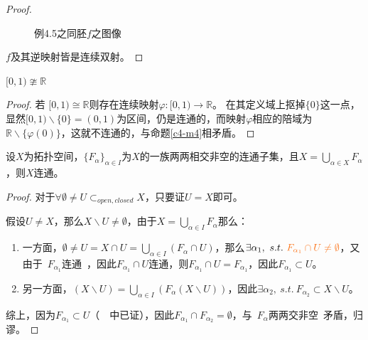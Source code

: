 \documentclass[lang=cn,10pt,device=pad]{elegantbook}
\newcommand{\cusong}{\CJKfamily{cusong}}%
\newcommand{\tl}[1]{\textcolor{myor}{#1}}
\newcommand{\lei}[1]{~\textcolor{myblu}{\cusong{#1}}~}
\newcommand{\lanse}[1]{~\textcolor{myblu}{#1}~}
\newcommand{\st}{~s.t.~}
\newcommand{\dabing}{\displaystyle\bigcup}
\newcommand{\dkh}[1]{\{#1\}}
\newcommand{\chadiao}{\backslash}
\newcommand{\R}{\mathbb{R}}
\begin{document}
\begin{proof}
\begin{figure}[h]
\caption{例4.5之同胚$f$之图像}
	\end{figure}
	$f$及其逆映射皆是连续双射。
\end{proof}

\begin{example}
	$[0,1)\ncong \mathbb{R}$
\end{example}
\begin{proof}
若	$[0,1)\cong \mathbb{R}$则存在连续映射$\varphi :[0,1)\longrightarrow \mathbb{R}$。
在其定义域上抠掉$\dkh{0}$这一点，显然$[0,1)\chadiao\dkh{0}=(0,1)$为区间，仍是连通的，而映射$\varphi$相应的陪域为$\R \chadiao \dkh{\varphi(0)}$，这就不连通的，与命题\ref{c4-m4}相矛盾。
\end{proof}


\begin{proposition}[连通的充分条件]\label{c4-m5}
	设$X$为拓扑空间，$\dkh{F_{\alpha}}_{\alpha\in I}$为$X$的一族两两相交非空的连通子集，且$X=\dabing_{\alpha \in X}F_{\alpha}$，则$X$连通。
\end{proposition}
\begin{proof}
	对于$\forall\emptyset\neq U\subset_{open,closed} X$，只要证$U=X$即可。
	
	假设$U\neq X$，那么$X\chadiao U\neq \emptyset$，由于$X = \dabing_{\alpha\in I}F_{\alpha}$那么：
	\begin{enumerate}
		\item 一方面，$\emptyset\neq U = X\cap U = \dabing_{\alpha\in I}(F_{\alpha}\cap U)$，那么$\exists \alpha_{1},\st \tl{F_{\alpha_{1}}\cap U\neq \emptyset}$，又由于\lanse{$F_{\alpha_{1}}$连通}，因此\tl{$F_{\alpha_{1}}\cap U$连通}，则$F_{\alpha_{1}}\cap U = F_{\alpha_{1}}$，因此$F_{\alpha_{1}}\subset U$。
		\item 另一方面，$(X\chadiao U) = \dabing_{\alpha \in I}(F_{\alpha}(X\chadiao U))$，因此$\exists \alpha_{2},\st F_{\alpha_{2}}\subset X\chadiao U$。
	\end{enumerate}
	综上，因为$F_{\alpha_{1}}\subset U$（\lei{1}中已证），因此$F_{\alpha_{1}}\cap F_{\alpha_{2}}=\emptyset$，与\lanse{$F_{\alpha}$两两交非空}矛盾，归谬。
\end{proof}
\end{document}
